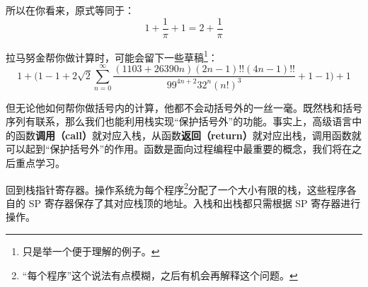 所以在你看来，原式等同于：
$$
1 + \dfrac{1}{\pi} + 1 = 2 + \dfrac{1}{\pi}
$$

拉马努金帮你做计算时，可能会留下一些草稿\footnote{只是举一个便于理解的例子。}：
$$
1 + \biggl( 1 - 1 + 2\sqrt{2} \sum\limits_{n = 0}^\infty \dfrac{(1103 + 26390 n) (2n - 1)!! (4n - 1)!!}{99^{4n + 2} 32^n (n!)^3} + 1 - 1 \biggr) + 1
$$

但无论他如何帮你做括号内的计算，他都不会动括号外的一丝一毫。既然栈和括号序列有联系，那么我们也能利用栈实现“保护括号外”的功能。事实上，高级语言中的函数\textbf{调用（call）}就对应入栈，从函数\textbf{返回（return）}就对应出栈，调用函数就可以起到“保护括号外”的作用。函数是面向过程编程中最重要的概念，我们将在之后重点学习。

回到栈指针寄存器。操作系统为每个程序\footnote{“每个程序”这个说法有点模糊，之后有机会再解释这个问题。}分配了一个大小有限的栈，这些程序各自的 SP 寄存器保存了其对应栈顶的地址。入栈和出栈都只需根据 SP 寄存器进行操作。